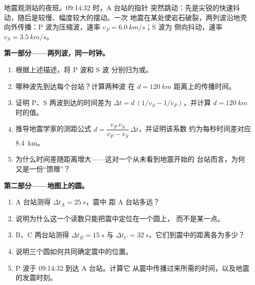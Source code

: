\begin{problem}
\label{pb:g12:mechanical-waves:1}
地震观测站的夜班。09:14:32 时，A 台站的指针
突然跳动：先是尖锐的快速抖动，随后是较慢、幅度较大的摆动。一次
地震在某处使岩石破裂，两列波沿地壳
向外传播：P 波为压缩波，速率 $v_P = \qty{6.0}{km/s}$；S 波为
侧向抖动，速率 $v_S = \qty{3.5}{km/s}$。

\medskip
\noindent\textbf{第一部分——两列波，同一时钟。}
\begin{enumerate}
  \item 根据上述描述，将 P 波和 S 波
        分别归为或。
  \item 哪种波先到达每个台站？计算两种波
        在 $d = \qty{120}{km}$ 距离上的传播时间。
  \item 证明 P、S 两波到达的时间差为
        $\Delta t = d\,(1/v_S - 1/v_P)$，并计算
        $d = \qty{120}{km}$ 时的值。
  \item 推导地震学家的测距公式
        $d = \dfrac{v_P\,v_S}{v_P - v_S}\,\Delta t$，并证明该系数
        约为每秒时间差对应 \qty{8.4}{km}。
  \item 为什么时间差随距离增大——这对一个从未看到地震开始的
        台站而言，为何又是一份“馈赠”？
\end{enumerate}

\medskip
\noindent\textbf{第二部分——地图上的圆。}
\begin{enumerate}[resume]
  \item A 台站测得 $\Delta t_A = \qty{25}{s}$，震中
        距 A 台站多远？
  \item 说明为什么这一个读数只能把震中定位在一个圆上，
        而不是某一点。
  \item B、C 两台站测得 $\Delta t_B = \qty{15}{s}$ 与
        $\Delta t_C = \qty{32}{s}$，它们到震中的距离各为多少？
  \item 说明三个圆如何共同确定震中的位置。
  \item P 波于 09:14:32 到达 A 台站。计算它
        从震中传播过来所需的时间，以及地震的发震时刻。
\end{enumerate}


\end{problem}
